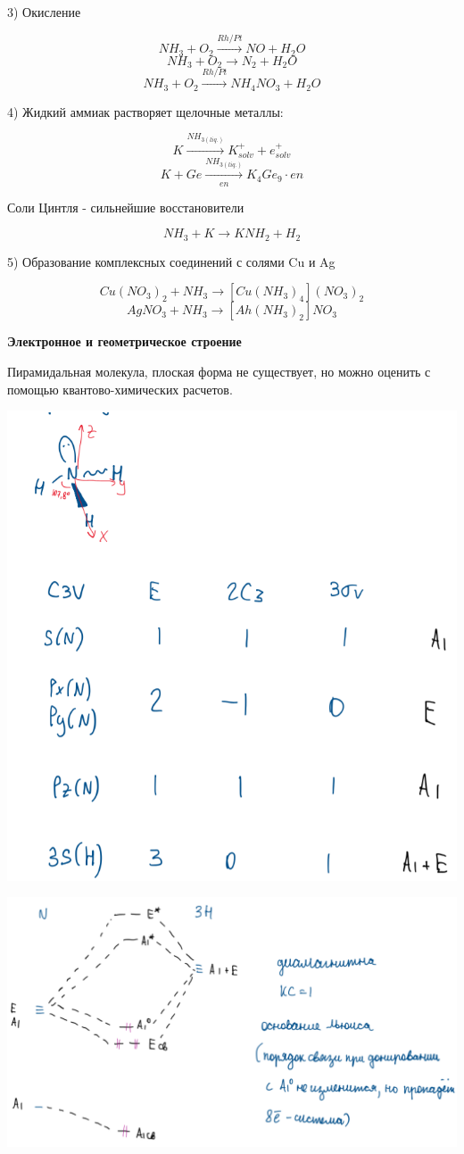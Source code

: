 \documentclass[14pt,a4paper]{scrartcl}
\begin{document}
3) Окисление

$$NH_3 + O_2 \xrightarrow{Rh/Pt} NO + H_2O$$
$$NH_3 + O_2 \rightarrow N_2 + H_2O$$
$$NH_3 + O_2 \xrightarrow{Rh/Pt} NH_4NO_3 + H_2O$$

4) Жидкий аммиак растворяет щелочные металлы:

$$K \xrightarrow{NH_{3(liq.)}} K_{solv}^+ + e_{solv}^+$$
$$ K + Ge \xrightarrow[en]{NH_{3(liq.)}} K_4Ge_9\cdot en$$

Соли Цинтля - сильнейшие восстановители

$$NH_3 + K \rightarrow KNH_2 + H_2$$

5) Образование комплексных соединений с солями Cu и Ag

$$Cu(NO_3)_2 + NH_3 \rightarrow [Cu(NH_3)_4](NO_3)_2$$
$$AgNO_3 + NH_3 \rightarrow [Ah(NH_3)_2]NO_3$$

\textbf{Электронное и геометрическое строение}

Пирамидальная молекула, плоская форма не существует, но можно оценить с помощью квантово-химических расчетов.

\includegraphics[scale=0.8]{8v2.png}

\includegraphics[scale=0.8]{8v3.png}
\end{document}
